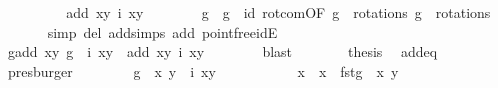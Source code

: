 \begin{isabellebody}
\ \ \ \ \isamarkupfalse%
\ \isamarkupfalse%
\ {\isachardoublequoteopen}{\isachardot}{\isachardot}{\isachardot}\ {\isacharequal}\ add\ {\isacharparenleft}x{\isacharcomma}y{\isacharparenright}\ {\isacharparenleft}i\ {\isacharparenleft}x{\isacharcomma}y{\isacharparenright}{\isacharparenright}{\isachardoublequoteclose}\isanewline
\ \ \ \ \ \ \isamarkupfalse%
\ {\isacartoucheopen}g\ {\isasymcirc}\ g{\isacharprime}\ {\isacharequal}\ id{\isacartoucheclose}\ rot{\isacharunderscore}com{\isacharbrackleft}OF\ {\isacartoucheopen}g\ {\isasymin}\ rotations{\isacartoucheclose}\ {\isacartoucheopen}g{\isacharprime}\ {\isasymin}\ rotations{\isacartoucheclose}{\isacharbrackright}\ \isanewline
\ \ \ \ \ \ \isamarkupfalse%
{\isacharparenleft}simp\ del{\isacharcolon}\ add{\isachardot}simps\ add{\isacharcolon}\ pointfree{\isacharunderscore}idE{\isacharparenright}\ \isanewline
\ \ \ \ \isamarkupfalse%
\ \isamarkupfalse%
\ {\isachardoublequoteopen}g{\isacharprime}{\isacharparenleft}add\ {\isacharparenleft}x{\isacharcomma}y{\isacharparenright}\ {\isacharparenleft}{\isacharparenleft}g\ {\isasymcirc}\ i{\isacharparenright}\ {\isacharparenleft}x{\isacharcomma}y{\isacharparenright}{\isacharparenright}{\isacharparenright}\ {\isacharequal}\ add\ {\isacharparenleft}x{\isacharcomma}y{\isacharparenright}\ {\isacharparenleft}i\ {\isacharparenleft}x{\isacharcomma}y{\isacharparenright}{\isacharparenright}{\isachardoublequoteclose}\isanewline
\ \ \ \ \ \ \isamarkupfalse%
\ blast\isanewline
\ \ \ \ \isamarkupfalse%
\ \isamarkupfalse%
\ {\isacharquery}thesis\ \isamarkupfalse%
\ add{\isacharunderscore}eq\ {}\ \isamarkupfalse%
\ presburger\isanewline
\ \ \isamarkupfalse%
\isanewline
\ \ \isamarkupfalse%
\ \isamarkupfalse%
\ {\isachardoublequoteopen}g{\isacharprime}\ {\isacharparenleft}{\isasymtau}\ {\isacharparenleft}x{\isacharprime}{\isacharcomma}\ y{\isacharprime}{\isacharparenright}{\isacharparenright}\ {\isacharequal}\ i\ {\isacharparenleft}x{\isacharcomma}y{\isacharparenright}{\isachardoublequoteclose}\ \isanewline
\ \ \isamarkupfalse%
\ {\isacharminus}\isanewline
\ \ \ \ \isamarkupfalse%
\ x{}\ \ {\isachardoublequoteopen}x{}\ {\isacharequal}\ fst{\isacharparenleft}g{\isacharprime}\ {\isacharparenleft}{\isasymtau}\ {\isacharparenleft}x{\isacharprime}{\isacharcomma}\ y{\isacharprime}{\isacharparenright}{\isacharparenright}{\isacharparenright}{\isachardoublequoteclose}\ \isanewline

\end{isabellebody}
